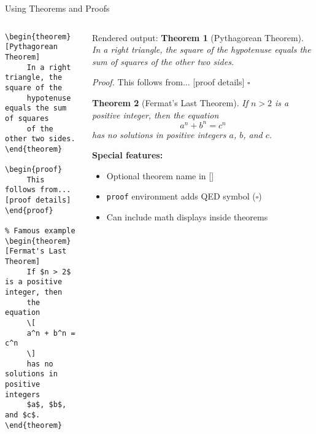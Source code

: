 \begin{frame}[fragile]{Using Theorems and Proofs}
     \begin{columns}
          \begin{column}{0.5\textwidth}
\begin{lstlisting}[basicstyle=\footnotesize\ttfamily]
% Basic usage
\begin{theorem}[Pythagorean Theorem]
     In a right triangle, the square of the 
     hypotenuse equals the sum of squares 
     of the other two sides.
\end{theorem}

\begin{proof}
     This follows from... [proof details]
\end{proof}

% Famous example
\begin{theorem}[Fermat's Last Theorem]
     If $n > 2$ is a positive integer, then 
     the equation
     \[
     a^n + b^n = c^n
     \]
     has no solutions in positive integers 
     $a$, $b$, and $c$.
\end{theorem}
               \end{lstlisting}
          \end{column}
          
          \begin{column}{0.5\textwidth}
               \def\labelenumi{\Roman{enumi}.}
               
               \begin{block}{Rendered output:}
                    \textbf{Theorem 1} (Pythagorean Theorem). \textit{In a right triangle, the square of the hypotenuse equals the sum of squares of the other two sides.}
                    
                    \textit{Proof.} This follows from... [proof details] \hfill $\square$
                    
                    \vspace{1em}
                    
                    \textbf{Theorem 2} (Fermat's Last Theorem). \textit{If $n > 2$ is a positive integer, then the equation
                         \[
                         a^n + b^n = c^n
                         \]
                         has no solutions in positive integers $a$, $b$, and $c$.}
               \end{block}
               
               \textbf{Special features:}
               \begin{itemize}
                    \item Optional theorem name in []
                    \item \texttt{proof} environment adds QED symbol ($\square$)
                    \item Can include math displays inside theorems
               \end{itemize}
          \end{column}
     \end{columns}
     

\end{frame}
